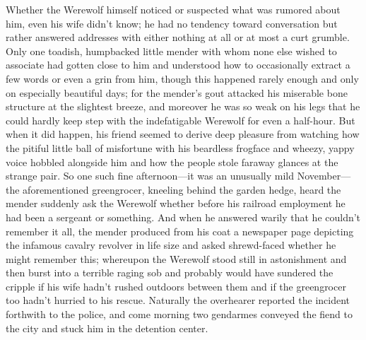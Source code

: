 \documentclass[12pt,a4paper]{article}
\begin{document}
Whether the Werewolf himself noticed or suspected what was rumored about him, even his wife didn’t know; he had no tendency toward conversation but rather answered addresses with either nothing at all or at most a curt grumble. Only one toadish, humpbacked little mender with whom none else wished to associate had gotten close to him and understood how to occasionally extract a few words or even a grin from him, though this happened rarely enough and only on especially beautiful days; for the mender’s gout attacked his miserable bone structure at the slightest breeze, and moreover he was so weak on his legs that he could hardly keep step with the indefatigable Werewolf for even a half-hour. But when it did happen, his friend seemed to derive deep pleasure from watching how the pitiful little ball of misfortune with his beardless frogface and wheezy, yappy voice hobbled alongside him and how the people stole faraway glances at the strange pair. So one such fine afternoon—it was an unusually mild November—the aforementioned greengrocer, kneeling behind the garden hedge, heard the mender suddenly ask the Werewolf whether before his railroad employment he had been a sergeant or something. And when he answered warily that he couldn’t remember it all, the mender produced from his coat a newspaper page depicting the infamous cavalry revolver in life size and asked shrewd-faced whether he might remember this; whereupon the Werewolf stood still in astonishment and then burst into a terrible raging sob and probably would have sundered the cripple if his wife hadn’t rushed outdoors between them and if the greengrocer too hadn’t hurried to his rescue. Naturally the overhearer reported the incident forthwith to the police, and come morning two gendarmes conveyed the fiend to the city and stuck him in the detention center.
\end{document}
